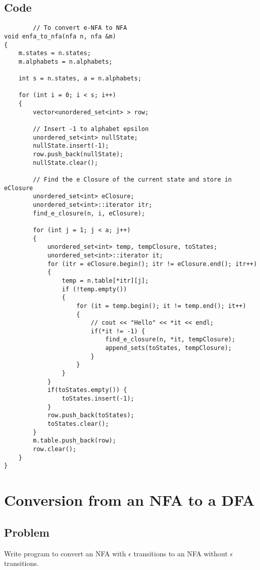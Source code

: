 \documentclass[a4paper, 12pt]{report}
\begin{document}
    \subsection{Code} 
    \begin{verbatim}
        // To convert e-NFA to NFA
void enfa_to_nfa(nfa n, nfa &m)
{
    m.states = n.states;
    m.alphabets = n.alphabets;

    int s = n.states, a = n.alphabets;

    for (int i = 0; i < s; i++)
    {
        vector<unordered_set<int> > row;

        // Insert -1 to alphabet epsilon
        unordered_set<int> nullState;
        nullState.insert(-1);
        row.push_back(nullState);
        nullState.clear();

        // Find the e Closure of the current state and store in eClosure
        unordered_set<int> eClosure;
        unordered_set<int>::iterator itr;
        find_e_closure(n, i, eClosure);

        for (int j = 1; j < a; j++)
        {
            unordered_set<int> temp, tempClosure, toStates;
            unordered_set<int>::iterator it;
            for (itr = eClosure.begin(); itr != eClosure.end(); itr++)
            {
                temp = n.table[*itr][j];
                if (!temp.empty())
                {
                    for (it = temp.begin(); it != temp.end(); it++)
                    {
                        // cout << "Hello" << *it << endl;
                        if(*it != -1) {
                            find_e_closure(n, *it, tempClosure);
                            append_sets(toStates, tempClosure);
                        }
                    }
                }
            }
            if(toStates.empty()) {
                toStates.insert(-1);
            }
            row.push_back(toStates);
            toStates.clear();
        }
        m.table.push_back(row);
        row.clear();
    }
}
    \end{verbatim}

    \newpage
    
    \section{Conversion from an NFA to a DFA}
    
    \subsection{Problem}
    Write program to convert an NFA with $\epsilon$ transitions to an NFA 
    without $\epsilon$ transitions.
\end{document}
